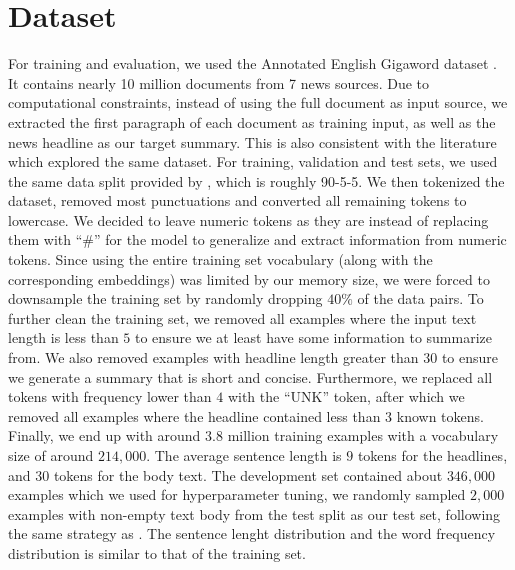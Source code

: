 \section{Dataset}
\label{sec: dataset}

For training and evaluation, we used the Annotated English Gigaword dataset \cite{graff2003english}. It contains nearly 10 million documents from 7 news sources. Due to computational constraints, instead of using the full document as input source, we extracted the first paragraph of each document as training input, as well as the news headline as our target summary. This is also consistent with the literature which explored the same dataset. For training, validation and test sets, we used the same data split provided by \cite{rush2015neural}, which is roughly 90-5-5. We then tokenized the dataset, removed most punctuations and converted all remaining tokens to lowercase. We decided to leave numeric tokens as they are instead of replacing them with ``$\#$'' for the model to generalize and extract information from numeric tokens. Since using the entire training set vocabulary (along with the corresponding embeddings) was limited by our memory size, we were forced to downsample the training set by randomly dropping $40\%$ of the data pairs. To further clean the training set, we removed all examples where the input text length is less than $5$ to ensure we at least have some information to summarize from. We also removed examples with headline length greater than $30$ to ensure we generate a summary that is short and concise. Furthermore, we replaced all tokens with frequency lower than $4$ with the ``UNK'' token, after which we removed all examples where the headline contained less than $3$ known tokens. Finally, we end up with around $3.8$ million training examples with a vocabulary size of around $214,000$. The average sentence length is $9$ tokens for the headlines, and $30$ tokens for the body text. The development set contained about $346,000$ examples which we used for hyperparameter tuning, we randomly sampled $2,000$ examples with non-empty text body from the test split as our test set, following the same strategy as \cite{rush2015neural}. The sentence lenght distribution and the word frequency distribution is similar to that of the training set.
